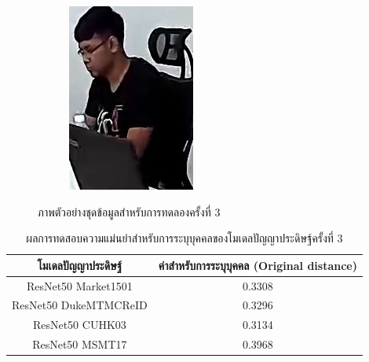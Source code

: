 \begin{figure}[!ht]
\begin{subfigure}[b]{0.2\textwidth}
        \includegraphics[width=\textwidth]{chapter4/images/fei_1.jpg}
        \label{fig:ex_6}
    \end{subfigure}
    \caption{ภาพตัวอย่างชุดข้อมูลสำหรับการทดลองครั้งที่ 3}
    \label{fig: ภาพตัวอย่างชุดข้อมูลสำหรับการทดลอง 3}
\end{figure}
\begin{table}[!ht]
    \centering
    \begin{tabular}{|c|c|}
		\hline
		{โมเดลปัญญาประดิษฐ์}&{ค่าสำหรับการระบุบุคคล (Original distance)}							\\
		\hline
		ResNet50 Market1501	 			& 0.3308								\\
		ResNet50 DukeMTMCReID			& 0.3296								\\
		ResNet50 CUHK03				& 0.3134								\\
		ResNet50 MSMT17				& 0.3968								\\
	\hline
    \end{tabular}
    \caption{ผลการทดสอบความแม่นยำสำหรับการระบุบุคคลของโมเดลปัญญาประดิษฐ์ครั้งที่ 3}
    \label{tab: Original distant of image 3}
\end{table}
